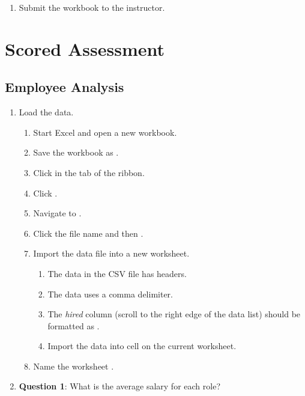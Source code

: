 \begin{enumerate}
	\item Submit the  workbook to the instructor.

\end{enumerate}

\section{Scored Assessment}

\subsection{Employee Analysis}

\begin{enumerate}
	\item Load the data.
	
	\begin{enumerate}
		\item Start Excel and open a new workbook.
		\item Save the workbook as .
		\item Click  in the  tab of the ribbon.
		\item Click . 
		\item Navigate to .
		\item Click the file name and then .
		\item Import the data file into a new worksheet.
		
		\begin{enumerate}
			\item The data in the CSV file has headers.
			\item The data uses a comma delimiter.
			\item The \textit{hired} column (scroll to the right edge of the data list) should be formatted as .
			\item Import the data into cell  on the current worksheet.
		\end{enumerate}
		
		\item Name the worksheet .
		
	\end{enumerate}
	
	\item{\textbf{Question 1}: What is the average salary for each role?}
	

\end{enumerate}
